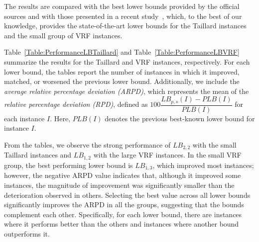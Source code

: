 \documentclass{article}
\theoremstyle{thmstyleone}%
\theoremstyle{thmstyletwo}%
\theoremstyle{thmstylethree}%
\begin{document}
The results are compared with the best lower bounds provided by the official sources 
and with those presented in a recent study~\cite{LowerBoundsNew}, which, to the best of our knowledge, provides the state-of-the-art lower bounds for the Taillard instances and the small group of VRF instances. 

Table~\ref{Table:PerformanceLBTaillard} and Table~\ref{Table:PerformanceLBVRF} summarize the results for the Taillard and VRF instances, respectively.
For each lower bound, the tables report the number of instances in which it improved, matched, or worsened the previous lower bound. Additionally, we include the \textit{average relative percentage deviation (ARPD)}, which represents the mean of the \textit{relative percentage deviation (RPD)}, defined as $100 \dfrac{LB_{p,s}(I) - PLB(I)}{PLB(I)}$ for each instance $I$. Here, $PLB(I)$ denotes the previous best-known lower bound for instance $I$.

From the tables, we  observe the strong performance of $LB_{2, 2}$ with the small Taillard instances and $LB_{1, 2}$ with the large VRF instances. 
In the small VRF group, the best performing lower bound is $LB_{1,3}$, which improved most instances; however, the negative ARPD value indicates that, although it improved some instances, the magnitude of improvement was significantly smaller than the deterioration observed in others. 
Selecting the best value across all lower bounds significantly improves the ARPD in all the groups, suggesting that the bounds complement each other. Specifically, for each lower bound, there are instances where it performs better than the others and instances where another bound outperforms it. 
\end{document}
